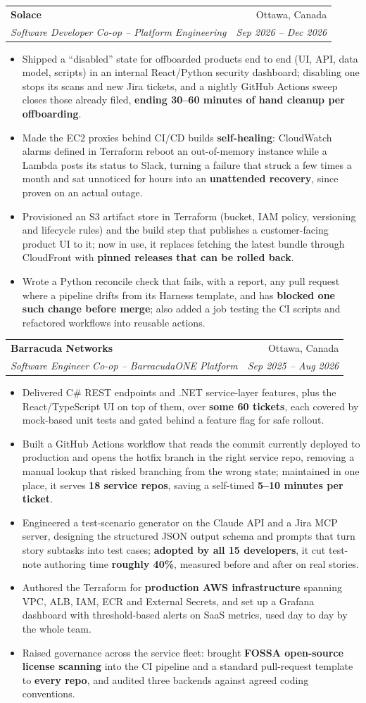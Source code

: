 \documentclass[letterpaper,10pt]{article}
\makeatletter
\newcommand{\resumeItem}[1]{
  \item\small{
    {#1 \vspace{-2pt}}
  }
}
\newcommand{\resumeSubheading}[4]{
  \vspace{-2pt}\item
    \begin{tabular*}{0.97\textwidth}[t]{l@{\extracolsep{\fill}}r}
      \textbf{#1} & #2 \\
      \textit{\small#3} & \textit{\small #4} \\
    \end{tabular*}\vspace{-7pt}
}
\newcommand{\resumeItemListStart}{\begin{itemize}[leftmargin=0.15in]}
\newcommand{\resumeItemListEnd}{\end{itemize}\vspace{-4pt}}
\makeatother
\begin{document}
    \resumeSubheading
      {Solace}{Ottawa, Canada}
      {Software Developer Co-op -- Platform Engineering}{Sep 2026 -- Dec 2026}
      \resumeItemListStart
        \resumeItem{Shipped a ``disabled'' state for offboarded products end to end (UI, API, data model, scripts) in an internal React/Python security dashboard; disabling one stops its scans and new Jira tickets, and a nightly GitHub Actions sweep closes those already filed, \textbf{ending 30--60 minutes of hand cleanup per offboarding}.}
        \resumeItem{Made the EC2 proxies behind CI/CD builds \textbf{self-healing}: CloudWatch alarms defined in Terraform reboot an out-of-memory instance while a Lambda posts its status to Slack, turning a failure that struck a few times a month and sat unnoticed for hours into an \textbf{unattended recovery}, since proven on an actual outage.}
        \resumeItem{Provisioned an S3 artifact store in Terraform (bucket, IAM policy, versioning and lifecycle rules) and the build step that publishes a customer-facing product UI to it; now in use, it replaces fetching the latest bundle through CloudFront with \textbf{pinned releases that can be rolled back}.}
        \resumeItem{Wrote a Python reconcile check that fails, with a report, any pull request where a pipeline drifts from its Harness template, and has \textbf{blocked one such change before merge}; also added a job testing the CI scripts and refactored workflows into reusable actions.}
      \resumeItemListEnd

    \resumeSubheading
      {Barracuda Networks}{Ottawa, Canada}
      {Software Engineer Co-op -- BarracudaONE Platform}{Sep 2025 -- Aug 2026}
      \resumeItemListStart
        \resumeItem{Delivered C\# REST endpoints and .NET service-layer features, plus the React/TypeScript UI on top of them, over \textbf{some 60 tickets}, each covered by mock-based unit tests and gated behind a feature flag for safe rollout.}
        \resumeItem{Built a GitHub Actions workflow that reads the commit currently deployed to production and opens the hotfix branch in the right service repo, removing a manual lookup that risked branching from the wrong state; maintained in one place, it serves \textbf{18 service repos}, saving a self-timed \textbf{5--10 minutes per ticket}.}
        \resumeItem{Engineered a test-scenario generator on the Claude API and a Jira MCP server, designing the structured JSON output schema and prompts that turn story subtasks into test cases; \textbf{adopted by all 15 developers}, it cut test-note authoring time \textbf{roughly 40\%}, measured before and after on real stories.}
        \resumeItem{Authored the Terraform for \textbf{production AWS infrastructure} spanning VPC, ALB, IAM, ECR and External Secrets, and set up a Grafana dashboard with threshold-based alerts on SaaS metrics, used day to day by the whole team.}
        \resumeItem{Raised governance across the service fleet: brought \textbf{FOSSA open-source license scanning} into the CI pipeline and a standard pull-request template to \textbf{every repo}, and audited three backends against agreed coding conventions.}
      \resumeItemListEnd
\end{document}
